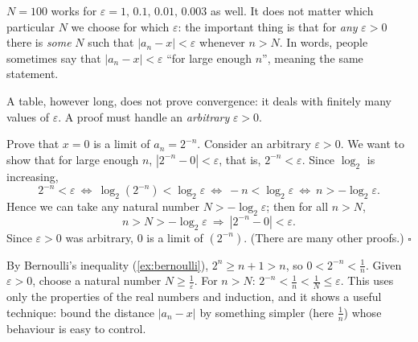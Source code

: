 \begin{note}
$N=100$ works for $\varepsilon=1,\,0.1,\,0.01,\,0.003$ as well. It does not matter which particular $N$ we choose for which
$\varepsilon$: the important thing is that for \emph{any} $\varepsilon>0$ there is \emph{some} $N$ such that
$|a_n-x|<\varepsilon$ whenever $n>N$. In words, people sometimes say that $|a_n-x|<\varepsilon$ ``for large enough $n$'',
meaning the same statement. 
\end{note}

A table, however long, does not prove convergence: it deals with finitely many values of $\varepsilon$. A proof must handle an
\emph{arbitrary} $\varepsilon>0$.

\begin{example}[$2^{-n}$ converges to $0$][ex:2n-proof]
Prove that $x=0$ is a limit of $a_n=2^{-n}$. 
\solution
Consider an arbitrary $\varepsilon>0$. We want to show that for large enough $n$, $|2^{-n}-0|<\varepsilon$, that is, $2^{-n}<\varepsilon$.
Since $\log_2$ is increasing,
\[
2^{-n}<\varepsilon\ \Longleftrightarrow\ \log_2(2^{-n})<\log_2\varepsilon\ \Longleftrightarrow\ -n<\log_2\varepsilon\ \Longleftrightarrow\ n>-\log_2\varepsilon.
\]
Hence we can take any natural number $N>-\log_2\varepsilon$; then for all $n>N$,
\[
n>N>-\log_2\varepsilon\ \Longrightarrow\ |2^{-n}-0|<\varepsilon.
\]
Since $\varepsilon>0$ was arbitrary, $0$ is a limit of $(2^{-n})$. (There are many other proofs.) $\square$
\end{example}

\begin{external}
By Bernoulli's inequality (\cref{ex:bernoulli}), $2^n\ge n+1>n$, so $0<2^{-n}<\frac1n$. Given $\varepsilon>0$, choose a natural
number $N\ge\frac1\varepsilon$. For $n>N$: $2^{-n}<\frac1n<\frac1N\le\varepsilon$. This uses only the properties of the real
numbers and induction, and it shows a useful technique: bound the distance $|a_n-x|$ by something simpler (here $\frac1n$)
whose behaviour is easy to control.
\end{external}

